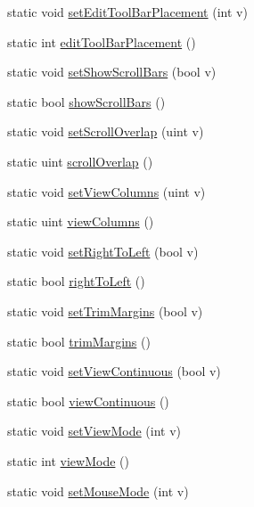 \begin{DoxyCompactItemize}
\item 
static void \hyperlink{classOkular_1_1Settings_a6c68ed3cce87748367aa89c24ecfb1d9}{set\+Edit\+Tool\+Bar\+Placement} (int v)
\item 
static int \hyperlink{classOkular_1_1Settings_a5896af2b1ae26f8aedf6c7054d8487ee}{edit\+Tool\+Bar\+Placement} ()
\item 
static void \hyperlink{classOkular_1_1Settings_a909b6ac5db31af7c18b30a45e0d743cf}{set\+Show\+Scroll\+Bars} (bool v)
\item 
static bool \hyperlink{classOkular_1_1Settings_a6e68d5b0a854abd409c5e92d297f0491}{show\+Scroll\+Bars} ()
\item 
static void \hyperlink{classOkular_1_1Settings_a8a8d82d3b87537d697bc9d7e1bc406a3}{set\+Scroll\+Overlap} (uint v)
\item 
static uint \hyperlink{classOkular_1_1Settings_a8b2239d7e07366a710b78124f9810778}{scroll\+Overlap} ()
\item 
static void \hyperlink{classOkular_1_1Settings_a8a00ee4f0af4abf04e0a927f2f385ec9}{set\+View\+Columns} (uint v)
\item 
static uint \hyperlink{classOkular_1_1Settings_a3d31d3fa4f0c9beedffe9bd2cf155d9b}{view\+Columns} ()
\item 
static void \hyperlink{classOkular_1_1Settings_a4fbd0bbef2962a4f41a23b163596db0a}{set\+Right\+To\+Left} (bool v)
\item 
static bool \hyperlink{classOkular_1_1Settings_a9d8daa38729daa991253e333fac91af7}{right\+To\+Left} ()
\item 
static void \hyperlink{classOkular_1_1Settings_a81e1aeb490e62b6ae45d8b3599254775}{set\+Trim\+Margins} (bool v)
\item 
static bool \hyperlink{classOkular_1_1Settings_a6c6808fd741b326185e293ff7aabe3ba}{trim\+Margins} ()
\item 
static void \hyperlink{classOkular_1_1Settings_a0b3e6ed082f099ed947c801073b38d29}{set\+View\+Continuous} (bool v)
\item 
static bool \hyperlink{classOkular_1_1Settings_a4cba59b24e7ad3e1c84a21933c35237c}{view\+Continuous} ()
\item 
static void \hyperlink{classOkular_1_1Settings_a1a252c21c82d9e7fc7fe2619e8273d99}{set\+View\+Mode} (int v)
\item 
static int \hyperlink{classOkular_1_1Settings_a46789f69b5576a3f78f1053e053e6590}{view\+Mode} ()
\item 
static void \hyperlink{classOkular_1_1Settings_ac1528adc9bb71bf16790286fd5a2aeaf}{set\+Mouse\+Mode} (int v)

\end{DoxyCompactItemize}
